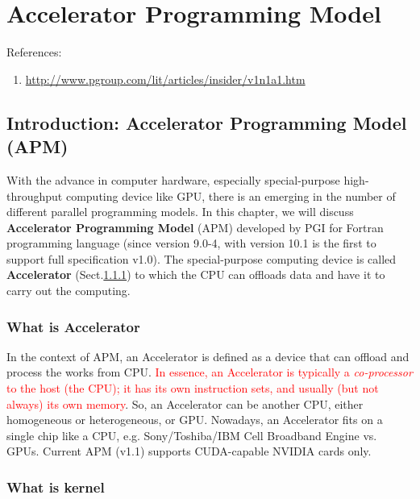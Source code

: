 
\chapter{Accelerator Programming Model}
\label{chap:accel-progr-model}

References:
\begin{enumerate}
\item \url{http://www.pgroup.com/lit/articles/insider/v1n1a1.htm}

\end{enumerate}


\section{Introduction: Accelerator Programming Model (APM)}
\label{sec:introduction-1}

With the advance in computer hardware, especially special-purpose
high-throughput computing device like GPU, there is an emerging in the number of
different parallel programming models. In this chapter, we will discuss {\bf
Accelerator Programming Model} (APM) developed by PGI for Fortran programming
language (since version 9.0-4, with version 10.1 is the first to support full
specification v1.0). The special-purpose computing device is called {\bf
Accelerator} (Sect.\ref{sec:Accelerator}) to which the CPU can offloads data and
have it to carry out the computing.

\subsection{What is Accelerator}
\label{sec:Accelerator}

In the context of APM, an Accelerator  is defined as a device that can
offload and process the works from CPU.
\textcolor{red}{In essence, an Accelerator is typically a
{\it co-processor} to the host (the CPU); it has its own instruction
sets, and usually (but not always) its own memory}.
So, an Accelerator can be another CPU, either homogeneous or
heterogeneous, or GPU. Nowadays, an Accelerator fits on a single chip
like a CPU, e.g. Sony/Toshiba/IBM Cell Broadband Engine
vs. GPUs. Current APM (v1.1) supports CUDA-capable NVIDIA cards only.

\subsection{What is kernel}

